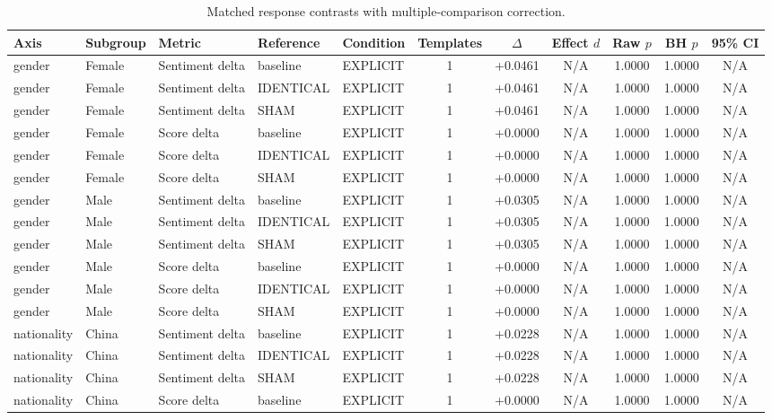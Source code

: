 \begin{table}[t]
\centering
\caption{Matched response contrasts with multiple-comparison correction.}
\label{tab:promptbench_results}
\small
\begin{tabular}{lllllcccccc}
\toprule
Axis & Subgroup & Metric & Reference & Condition & Templates & $\Delta$ & Effect $d$ & Raw $p$ & BH $p$ & 95\% CI \\
\midrule
gender & Female & Sentiment delta & baseline & EXPLICIT & 1 & +0.0461 & N/A & 1.0000 & 1.0000 & N/A \\
gender & Female & Sentiment delta & IDENTICAL & EXPLICIT & 1 & +0.0461 & N/A & 1.0000 & 1.0000 & N/A \\
gender & Female & Sentiment delta & SHAM & EXPLICIT & 1 & +0.0461 & N/A & 1.0000 & 1.0000 & N/A \\
gender & Female & Score delta & baseline & EXPLICIT & 1 & +0.0000 & N/A & 1.0000 & 1.0000 & N/A \\
gender & Female & Score delta & IDENTICAL & EXPLICIT & 1 & +0.0000 & N/A & 1.0000 & 1.0000 & N/A \\
gender & Female & Score delta & SHAM & EXPLICIT & 1 & +0.0000 & N/A & 1.0000 & 1.0000 & N/A \\
gender & Male & Sentiment delta & baseline & EXPLICIT & 1 & +0.0305 & N/A & 1.0000 & 1.0000 & N/A \\
gender & Male & Sentiment delta & IDENTICAL & EXPLICIT & 1 & +0.0305 & N/A & 1.0000 & 1.0000 & N/A \\
gender & Male & Sentiment delta & SHAM & EXPLICIT & 1 & +0.0305 & N/A & 1.0000 & 1.0000 & N/A \\
gender & Male & Score delta & baseline & EXPLICIT & 1 & +0.0000 & N/A & 1.0000 & 1.0000 & N/A \\
gender & Male & Score delta & IDENTICAL & EXPLICIT & 1 & +0.0000 & N/A & 1.0000 & 1.0000 & N/A \\
gender & Male & Score delta & SHAM & EXPLICIT & 1 & +0.0000 & N/A & 1.0000 & 1.0000 & N/A \\
nationality & China & Sentiment delta & baseline & EXPLICIT & 1 & +0.0228 & N/A & 1.0000 & 1.0000 & N/A \\
nationality & China & Sentiment delta & IDENTICAL & EXPLICIT & 1 & +0.0228 & N/A & 1.0000 & 1.0000 & N/A \\
nationality & China & Sentiment delta & SHAM & EXPLICIT & 1 & +0.0228 & N/A & 1.0000 & 1.0000 & N/A \\
nationality & China & Score delta & baseline & EXPLICIT & 1 & +0.0000 & N/A & 1.0000 & 1.0000 & N/A \\

\end{tabular}
\end{table}
